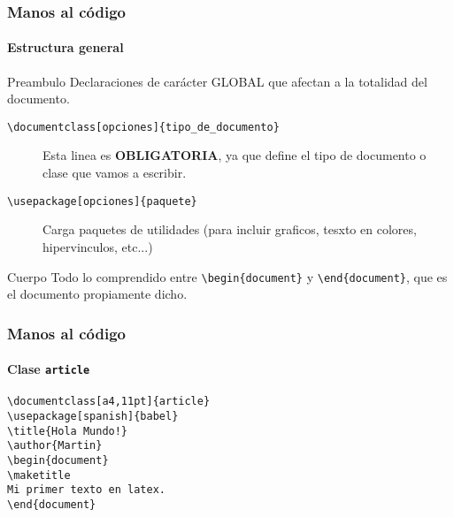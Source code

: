 \documentclass[12pt]{beamer}
\begin{document}
\begin{frame}%
  \frametitle{Manos al código}
  \framesubtitle{Estructura general}\pause
  \begin{block}{Preambulo}
    Declaraciones de carácter GLOBAL que afectan a la totalidad del documento.
    \begin{description}
    \item[\texttt{\textbackslash documentclass[opciones]\{tipo\_de\_documento\}}]

      Esta linea es \textbf{OBLIGATORIA}, ya que define el tipo de documento o clase que vamos a escribir.

    \item[\texttt{\textbackslash usepackage[opciones]\{paquete\}}]

      Carga paquetes de utilidades (para incluir graficos, tesxto en colores, hipervinculos, etc...)
    \end{description}
  \end{block}\pause
  \begin{block}{Cuerpo}
    Todo lo comprendido entre \texttt{\textbackslash begin\{document\}} y \texttt{\textbackslash end\{document\}}, que es el documento propiamente dicho.
  \end{block}\pause
\end{frame}

\begin{frame}%
  \frametitle{Manos al código}
  \framesubtitle{Clase \texttt{article}}
  \begin{block}{}
    \texttt{\textbackslash documentclass[a4,11pt]\{article\}\\
      \textbackslash usepackage[spanish]\{babel\}\\
      \bigskip
      \textbackslash title\{Hola Mundo!\}\\
      \textbackslash author\{Martin\}\\
      \bigskip
      \textbackslash begin\{document\}\\
      \textbackslash maketitle\\
      \bigskip
      Mi primer texto en latex.\\
      \bigskip
      \textbackslash end\{document\}
    }
\end{block}
\end{frame}
\end{document}
